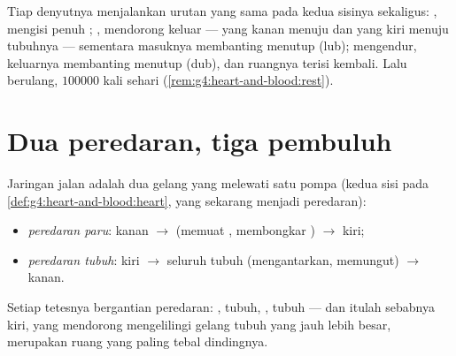 \begin{proposition}\label{prop:g7:heart-and-circulation:beat}
Tiap denyutnya menjalankan urutan yang sama pada kedua sisinya
sekaligus:  , mengisi penuh ; 
, mendorong  keluar --- yang kanan menuju
 dan yang kiri menuju tubuhnya --- sementara  masuknya
membanting menutup (lub);  mengendur,  keluarnya
membanting menutup (dub), dan ruangnya terisi kembali. Lalu berulang,
$100000$ kali sehari
(\cref{rem:g4:heart-and-blood:rest}).
\end{proposition}
\admitted

\section{Dua peredaran, tiga pembuluh}

\begin{definition}\label{def:g7:heart-and-circulation:double}
Jaringan jalan  adalah dua gelang yang melewati satu pompa
(kedua sisi pada \cref{def:g4:heart-and-blood:heart}, yang sekarang
menjadi peredaran):
\begin{itemize}
  \item \emph{peredaran paru}:  kanan $\rightarrow$ 
        (memuat , membongkar ) $\rightarrow$
         kiri;
  \item \emph{peredaran tubuh}:  kiri $\rightarrow$ seluruh tubuh
        (mengantarkan, memungut) $\rightarrow$  kanan.
\end{itemize}
Setiap tetesnya bergantian peredaran: , tubuh, ,
tubuh --- dan itulah sebabnya  kiri, yang mendorong mengelilingi
gelang tubuh yang jauh lebih besar, merupakan ruang  yang
paling tebal dindingnya.
\end{definition}

